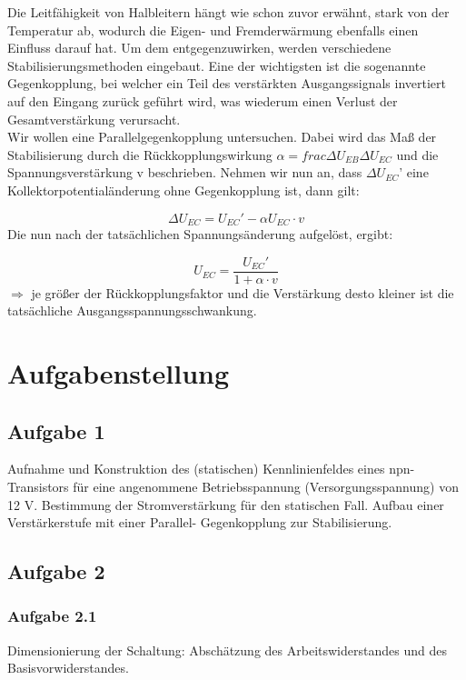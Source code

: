 \documentclass{article}
\begin{document}
Die Leitfähigkeit von Halbleitern hängt wie schon zuvor erwähnt, stark von der Temperatur ab, wodurch die Eigen- und Fremderwärmung ebenfalls einen Einfluss darauf hat. Um dem entgegenzuwirken, werden verschiedene Stabilisierungsmethoden eingebaut. Eine der wichtigsten ist die sogenannte Gegenkopplung, bei welcher ein Teil des verstärkten Ausgangssignals invertiert auf den Eingang zurück geführt wird, was wiederum einen Verlust der Gesamtverstärkung verursacht.\\
Wir wollen eine Parallelgegenkopplung untersuchen. Dabei wird das Maß der Stabilisierung durch die Rückkopplungswirkung \(\alpha=frac{\Delta U_{EB}}{\Delta U_{EC}}\) und die Spannungsverstärkung v beschrieben. Nehmen wir nun an, dass \(\Delta U_{EC}\)' eine Kollektorpotentialänderung ohne Gegenkopplung ist, dann gilt:

\begin{equation}
\Delta U_{EC}=U_{EC}'-\alpha U_{EC}\cdot v
\end{equation}
Die nun nach der tatsächlichen Spannungsänderung aufgelöst, ergibt:

\begin{equation}
U_{EC}=\frac{U_{EC}'}{1+\alpha \cdot v}
\end{equation}
\(\Rightarrow\) je größer der Rückkopplungsfaktor und die Verstärkung desto kleiner ist die tatsächliche Ausgangsspannungsschwankung.
\newpage
\section{Aufgabenstellung}
\subsection*{Aufgabe 1}
Aufnahme und Konstruktion des (statischen) Kennlinienfeldes eines npn-Transistors für eine
angenommene Betriebsspannung (Versorgungsspannung) von 12 V. Bestimmung der Stromverstärkung für
den statischen Fall. Aufbau einer Verstärkerstufe mit einer Parallel- Gegenkopplung zur
Stabilisierung.

\subsection*{Aufgabe 2}
\subsubsection*{Aufgabe 2.1}
Dimensionierung der Schaltung: Abschätzung des Arbeitswiderstandes und des Basisvorwiderstandes.
\end{document}
